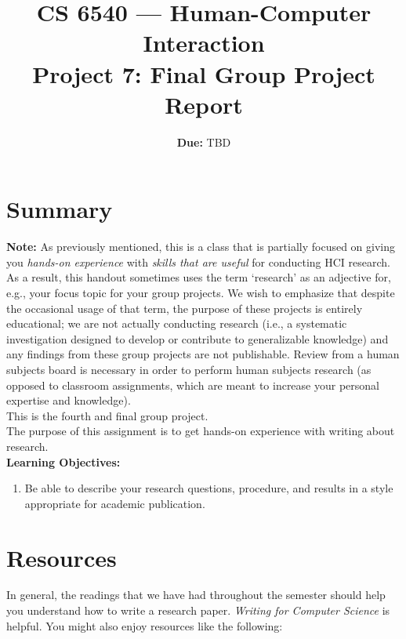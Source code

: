 \documentclass{article}
\title{CS 6540 --- Human-Computer Interaction\\\textbf{Project 7: Final Group Project Report}}
\author{ }
\date{\textbf{Due:} TBD}
\begin{document}
\maketitle

\section{Summary}
\textbf{Note:} As previously mentioned, this is a class that is partially focused on giving you \textit{hands-on experience} with \textit{skills that are useful} for conducting HCI research. As a result, this handout sometimes uses the term `research' as an adjective for, e.g., your focus topic for your group projects. We wish to emphasize that despite the occasional usage of that term, the purpose of these projects is entirely educational; we are not actually conducting research (i.e., a systematic investigation designed to develop or contribute to generalizable knowledge) and any findings from these group projects are not publishable. Review from a human subjects board is necessary in order to perform human subjects research (as opposed to classroom assignments, which are meant to increase your personal expertise and knowledge).\\

This is the fourth and final group project.\\

The purpose of this assignment is to get hands-on experience with writing about research.\\

\textbf{Learning Objectives:}
\begin{enumerate}
    \item Be able to describe your research questions, procedure, and results in a style appropriate for academic publication.
\end{enumerate}

\section{Resources}
In general, the readings that we have had throughout the semester should help you understand how to write a research paper. \textit{Writing for Computer Science} is helpful. You might also enjoy resources like the following:
\end{document}
